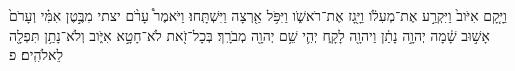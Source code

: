 \documentclass{openreader}
\begin{document}
וַיָּ֤קָם אִיֹּוב֙ וַיִּקְרַ֣ע אֶת־מְעִלֹ֔ו וַיָּ֖גָז אֶת־רֹאשֹׁ֑ו וַיִּפֹּ֥ל אַ֖רְצָה וַיִּשְׁתָּֽחוּ׃ 
וַיֹּאמֶר֩ עָרֹ֨ם יצתי מִבֶּ֣טֶן אִמִּ֗י וְעָרֹם֙ אָשׁ֣וּב שָׁ֔מָה יְהוָ֣ה נָתַ֔ן וַיהוָ֖ה לָקָ֑ח יְהִ֛י שֵׁ֥ם יְהוָ֖ה מְבֹרָֽךְ׃ 
בְּכָל־זֹ֖את לֹא־חָטָ֣א אִיֹּ֑וב וְלֹא־נָתַ֥ן תִּפְלָ֖ה לֵאלֹהִֽים׃ פ 
\end{document}
